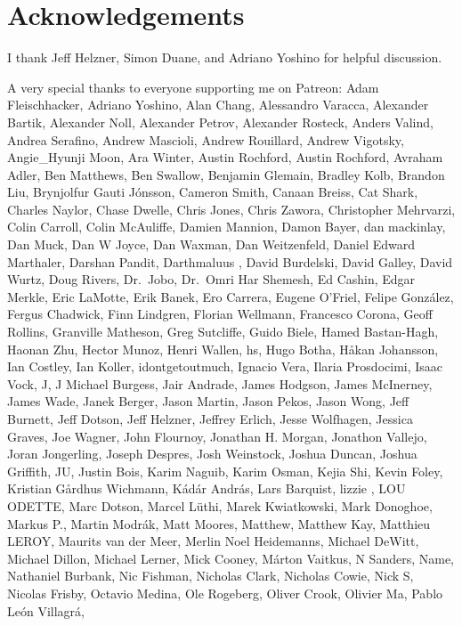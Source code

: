 \documentclass[
  letterpaper,
  DIV=11,
  numbers=noendperiod]{scrartcl}
\begin{document}
\hypertarget{acknowledgements}{%
\section{Acknowledgements}\label{acknowledgements}}

I thank Jeff Helzner, Simon Duane, and Adriano Yoshino for helpful
discussion.

A very special thanks to everyone supporting me on Patreon: Adam
Fleischhacker, Adriano Yoshino, Alan Chang, Alessandro Varacca,
Alexander Bartik, Alexander Noll, Alexander Petrov, Alexander Rosteck,
Anders Valind, Andrea Serafino, Andrew Mascioli, Andrew Rouillard,
Andrew Vigotsky, Angie\_Hyunji Moon, Ara Winter, Austin Rochford, Austin
Rochford, Avraham Adler, Ben Matthews, Ben Swallow, Benjamin Glemain,
Bradley Kolb, Brandon Liu, Brynjolfur Gauti Jónsson, Cameron Smith,
Canaan Breiss, Cat Shark, Charles Naylor, Chase Dwelle, Chris Jones,
Chris Zawora, Christopher Mehrvarzi, Colin Carroll, Colin McAuliffe,
Damien Mannion, Damon Bayer, dan mackinlay, Dan Muck, Dan W Joyce, Dan
Waxman, Dan Weitzenfeld, Daniel Edward Marthaler, Darshan Pandit,
Darthmaluus , David Burdelski, David Galley, David Wurtz, Doug Rivers,
Dr.~Jobo, Dr.~Omri Har Shemesh, Ed Cashin, Edgar Merkle, Eric LaMotte,
Erik Banek, Ero Carrera, Eugene O'Friel, Felipe González, Fergus
Chadwick, Finn Lindgren, Florian Wellmann, Francesco Corona, Geoff
Rollins, Granville Matheson, Greg Sutcliffe, Guido Biele, Hamed
Bastan-Hagh, Haonan Zhu, Hector Munoz, Henri Wallen, hs, Hugo Botha,
Håkan Johansson, Ian Costley, Ian Koller, idontgetoutmuch, Ignacio Vera,
Ilaria Prosdocimi, Isaac Vock, J, J Michael Burgess, Jair Andrade, James
Hodgson, James McInerney, James Wade, Janek Berger, Jason Martin, Jason
Pekos, Jason Wong, Jeff Burnett, Jeff Dotson, Jeff Helzner, Jeffrey
Erlich, Jesse Wolfhagen, Jessica Graves, Joe Wagner, John Flournoy,
Jonathan H. Morgan, Jonathon Vallejo, Joran Jongerling, Joseph Despres,
Josh Weinstock, Joshua Duncan, Joshua Griffith, JU, Justin Bois, Karim
Naguib, Karim Osman, Kejia Shi, Kevin Foley, Kristian Gårdhus Wichmann,
Kádár András, Lars Barquist, lizzie , LOU ODETTE, Marc Dotson, Marcel
Lüthi, Marek Kwiatkowski, Mark Donoghoe, Markus P., Martin Modrák, Matt
Moores, Matthew, Matthew Kay, Matthieu LEROY, Maurits van der Meer,
Merlin Noel Heidemanns, Michael DeWitt, Michael Dillon, Michael Lerner,
Mick Cooney, Márton Vaitkus, N Sanders, Name, Nathaniel Burbank, Nic
Fishman, Nicholas Clark, Nicholas Cowie, Nick S, Nicolas Frisby, Octavio
Medina, Ole Rogeberg, Oliver Crook, Olivier Ma, Pablo León Villagrá,
\end{document}
